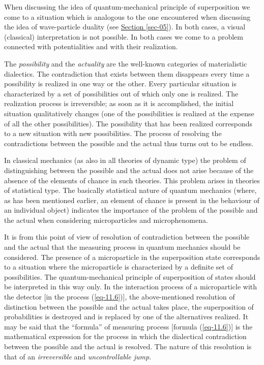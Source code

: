 \documentclass[a4paper,sfsidenotes,colorlinks=true]{tufte-book}
\numberwithin{equation}{section}
\numberwithin{figure}{section}
\begin{document}
When discussing the idea of quantum-mechanical principle of
superposition we come to a situation which is analogous to the one
encountered when discussing the idea of wave-particle duality (see
\hyperref[sec-05]{Section \ref{sec-05}}). In both cases, a visual
(classical) interpretation is not possible. In both cases we come to a
problem connected with potentialities and with their realization.


The \emph{possibility} and the \emph{actuality} are the well-known categories of materialistic dialectics. The contradiction that exists between them disappears every time a possibility is realized in one way or the other. Every particular situation is characterized by a set of possibilities out of which only one is realized. The realization process is irreversible; as soon as it is accomplished, the initial situation qualitatively changes (one of the possibilities is realized at the expense of all the other possibilities). The possibility that has been realized corresponds to a new situation with new possibilities. The process of resolving the contradictions between the possible and the actual thus turns out to be endless.


In classical mechanics (as also in all theories of dynamic type) the problem of distinguishing between the possible and the actual does not arise because of the absence of the elements of chance in such theories. This problem arises in theories of statistical type. The basically statistical nature of quantum mechanics (where, as has been mentioned earlier, an element of chance is present in the behaviour of an individual object) indicates the importance of the problem of the possible and the actual when considering microparticles and microphenomena.


It is from this point of view of resolution of contradiction between the possible and the actual that the measuring process in quantum mechanics should be considered. The presence of a microparticle in the superposition state corresponds to a situation where the microparticle is characterized by a definite set of possibilities. The quantum-mechanical principle of superposition of states should be interpreted in this way only. In the interaction process of a microparticle with the detector [in the process (\ref{eq-11.6})], the above-mentioned resolution of distinction between the possible and the actual takes place, the superposition of probabilities is destroyed and is replaced by one of the alternatives realized. It may be said that the ``formula'' of measuring process [formula (\ref{eq-11.6})] is the mathematical expression for the process in which the dialectical contradiction between the possible and the actual is resolved. The nature of this resolution is that of an \emph{irreversible} and \emph{uncontrollable jump}.
\end{document}
